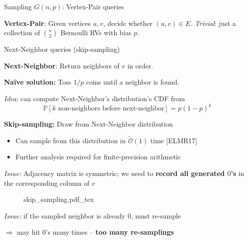 \begin{block}{Sampling $G(n, p)$: \textsf{Vertex-Pair} queries}


\textbf{\textsf{Vertex-Pair}}: Given vertices $u, v$, decide whether $(u,v)\in E$.
    \emph{Trivial}: just a collection of $n \choose 2$ Bernoulli RVs with bias $p$.

\end{block}

\begin{block}{\textsf{Next-Neighbor} queries (skip-sampling)}

\textbf{\textsf{Next-Neighbor}}: Return neighbors of $v$ in order.

\vspace{15pt}


\colorbox{BlueGreen}{\textbf{Na\"ive solution:}} Toss $1/p$ coins until a neighbor is found.

\emph{Idea}: can compute \textsf{Next-Neighbor}'s distribution's CDF from
\vspace{-10pt}
\[ \mathbb P[k \textrm{ non-neighbors before next-neighbor}] = p(1-p)^k \]

\colorbox{BlueGreen}{\textbf{Skip-sampling:}} Draw from \textsf{Next-Neighbor} distribution
\vspace{-20pt}
\begin{itemize}
    \item Can sample from this distribution in $\tilde{\mathcal O}(1)$ time [ELMR17]
    \item Further analysis required for finite-precision arithmetic
\end{itemize}

\emph{\color{red}Issue:} Adjacency matrix is symmetric; we need to \textbf{record all generated $0$'s} in the corresponding column of $v$

\begin{figure}[h!]\centering
    \def\svgwidth{0.9\columnwidth}
    {skip_sampling.pdf_tex}
\end{figure}
\emph{\color{red}Issue:} if the sampled neighbor is already $0$, must re-sample

\quad$\Rightarrow$ may hit $0$'s many times -- \textbf{too many re-samplings}

\end{block}
